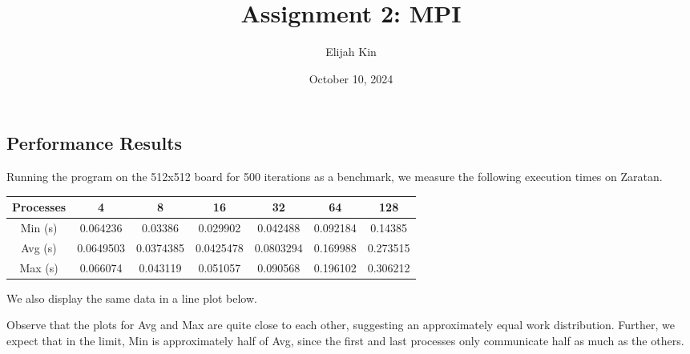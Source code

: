 \documentclass{article}
\title{Assignment 2: MPI}
\author{Elijah Kin}
\date{October 10, 2024}
\begin{document}
  \maketitle


  \subsection*{Performance Results}
  Running the program on the 512x512 board for 500 iterations as a benchmark, we measure the following execution times on Zaratan.
  \begin{center}
    \begin{tabular}{ |c|c|c|c|c|c|c| }
      \hline
      Processes & 4 & 8 & 16 & 32 & 64 & 128 \\
      \hline
      Min (s) & 0.064236 & 0.03386 & 0.029902 & 0.042488 & 0.092184 & 0.14385 \\
      \hline
      Avg (s) & 0.0649503 & 0.0374385 & 0.0425478 & 0.0803294 & 0.169988 & 0.273515 \\
      \hline
      Max (s) & 0.066074 & 0.043119 & 0.051057 & 0.090568 & 0.196102 & 0.306212 \\
      \hline
     \end{tabular}
  \end{center}
  We also display the same data in a line plot below.
  \begin{center}
  \end{center}
  Observe that the plots for Avg and Max are quite close to each other, suggesting an approximately equal work distribution. Further, we expect that in the limit, Min is approximately half of Avg, since the first and last processes only communicate half as much as the others.
\end{document}
